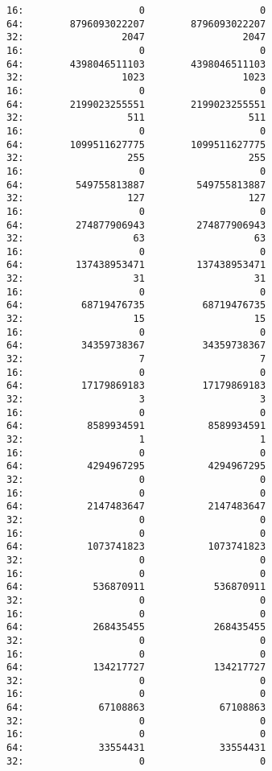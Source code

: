 \documentclass[11pt]{article}
\begin{document}
\begin{verbatim}
16:                    0                    0
64:        8796093022207        8796093022207
32:                 2047                 2047
16:                    0                    0
64:        4398046511103        4398046511103
32:                 1023                 1023
16:                    0                    0
64:        2199023255551        2199023255551
32:                  511                  511
16:                    0                    0
64:        1099511627775        1099511627775
32:                  255                  255
16:                    0                    0
64:         549755813887         549755813887
32:                  127                  127
16:                    0                    0
64:         274877906943         274877906943
32:                   63                   63
16:                    0                    0
64:         137438953471         137438953471
32:                   31                   31
16:                    0                    0
64:          68719476735          68719476735
32:                   15                   15
16:                    0                    0
64:          34359738367          34359738367
32:                    7                    7
16:                    0                    0
64:          17179869183          17179869183
32:                    3                    3
16:                    0                    0
64:           8589934591           8589934591
32:                    1                    1
16:                    0                    0
64:           4294967295           4294967295
32:                    0                    0
16:                    0                    0
64:           2147483647           2147483647
32:                    0                    0
16:                    0                    0
64:           1073741823           1073741823
32:                    0                    0
16:                    0                    0
64:            536870911            536870911
32:                    0                    0
16:                    0                    0
64:            268435455            268435455
32:                    0                    0
16:                    0                    0
64:            134217727            134217727
32:                    0                    0
16:                    0                    0
64:             67108863             67108863
32:                    0                    0
16:                    0                    0
64:             33554431             33554431
32:                    0                    0

\end{verbatim}
\end{document}
